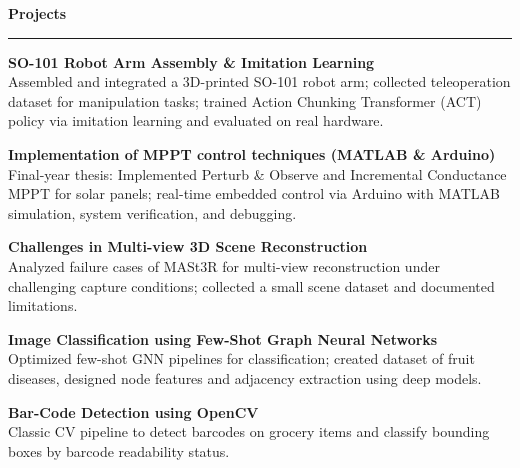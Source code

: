 \documentclass[10pt]{article}
\newcommand{\sect}[1]{\vspace{2pt}\noindent\textbf{\large #1}\vspace{1pt}\hrule\vspace{2pt}}
\begin{document}
\sect{Projects}

\textbf{SO-101 Robot Arm Assembly \& Imitation Learning}\\
Assembled and integrated a 3D-printed SO-101 robot arm; collected teleoperation dataset for manipulation tasks; trained Action Chunking Transformer (ACT) policy via imitation learning and evaluated on real hardware.

\textbf{Implementation of MPPT control techniques (MATLAB \& Arduino)}\\
Final-year thesis: Implemented Perturb \& Observe and Incremental Conductance MPPT for solar panels; real-time embedded control via Arduino with MATLAB simulation, system verification, and debugging.

\textbf{Challenges in Multi-view 3D Scene Reconstruction}\\
Analyzed failure cases of MASt3R for multi-view reconstruction under challenging capture conditions; collected a small scene dataset and documented limitations.

\textbf{Image Classification using Few-Shot Graph Neural Networks}\\
Optimized few-shot GNN pipelines for classification; created dataset of fruit diseases, designed node features and adjacency extraction using deep models.

\textbf{Bar-Code Detection using OpenCV}\\
Classic CV pipeline to detect barcodes on grocery items and classify bounding boxes by barcode readability status.
\end{document}
